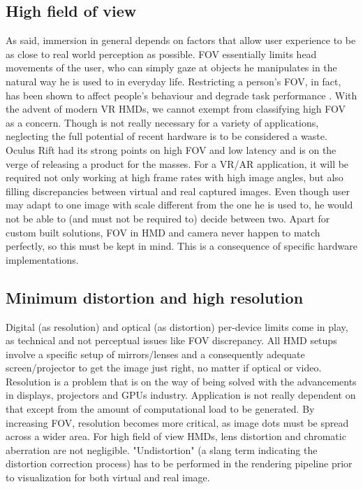\subsection{High field of view}
As said, immersion in general depends on factors that allow user experience to be as close to real world perception as possible. FOV essentially limits head movements of the user, who can simply gaze at objects he manipulates in the natural way he is used to in everyday life. Restricting a person’s FOV, in fact, has been shown to affect people’s behaviour and degrade task performance \cite{restricting_FOV}. With the advent of modern VR HMDs, we cannot exempt from classifying high FOV as a concern. Though is not really necessary for a variety of applications, neglecting the full potential of recent hardware is to be considered a waste. Oculus Rift had its strong points on high FOV and low latency and is on the verge of releasing a product for the masses. For a VR/AR application, it will be required not only working at high frame rates with high image angles, but also filling discrepancies between virtual and real captured images. Even though user may adapt to one image with scale different from the one he is used to, he would not be able to (and must not be required to) decide between two. Apart for custom built solutions, FOV in HMD and camera never happen to match perfectly, so this must be kept in mind. This is a consequence of specific hardware implementations.

\subsection{Minimum distortion and high resolution}
Digital (as resolution) and optical (as distortion) per-device limits come in play, as technical and not perceptual issues like FOV discrepancy. All HMD setups involve a specific setup of mirrors/lenses and a consequently adequate screen/projector to get the image just right, no matter if optical or video. Resolution is a problem that is on the way of being solved with the advancements in displays, projectors and GPUs industry. Application is not really dependent on that except from the amount of computational load to be generated. By increasing FOV, resolution becomes more critical, as image dots must be spread across a wider area.
For high field of view HMDs, lens distortion and chromatic aberration are not negligible. "Undistortion" (a slang term indicating the distortion correction process) has to be performed in the rendering pipeline prior to visualization for both virtual and real image.

